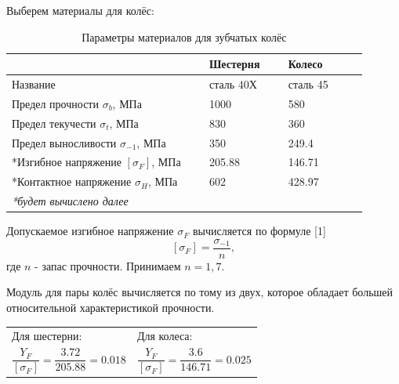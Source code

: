 \documentclass[14pt,a4paper,russian]{scrartcl}
\begin{document}
        Выберем материалы для колёс:
        \begin{table}[h!]
            \begin{center}
                \begin{tabular}{p{0.5\linewidth}p{0.2\linewidth}p{0.2\linewidth}}
                    \hline
                        & Шестерня  &   Колесо\\
                    \hline
                    Название    & сталь 40Х &   сталь 45 \\
                    Предел прочности \( \sigma_b \), МПа  & 1000 & 580 \\
                    Предел текучести \( \sigma_t \), МПа  &   830 & 360 \\
                    Предел выносливости \( \sigma_{-1} \), МПа  & 350 & 249.4 \\
                    *Изгибное напряжение \( [\sigma_F] \), МПа & 205.88 & 146.71 \\
                    *Контактное напряжение \( \sigma_H \), МПа & 602 & 428.97 \\
                    \hline
                    \emph{*будет вычислено далее}
                \end{tabular}
                \caption{Параметры материалов для зубчатых колёс}\label{tab:gear_materials}
            \end{center}
        \end{table}

        Допускаемое изгибное напряжение \( \sigma_F \) вычисляется по формуле [1] 
        \[ [\sigma_F] = \frac{\sigma_{-1}}{n}, \]
        где \( n \) - запас прочности. Принимаем \( n=1,7 \).\par
        
        Модуль для пары колёс вычисляется по тому из двух, которое обладает
        большей относительной характеристикой прочности.

       \begin{table}[h!]
            \begin{center}
                \begin{tabular}{p{0.5\linewidth}p{0.5\linewidth}}
                    Для шестерни:  &   Для колеса:\\
                    \[ \frac{Y_F}{[\sigma_F]} = 
                        \frac{3.72}{205.88} = 0.018\] &
                    \[ \frac{Y_F}{[\sigma_F]} = 
                    \frac{3.6}{146.71} = 0.025 \]\\                    
                \end{tabular}
            \end{center}
        \end{table}
\end{document}
